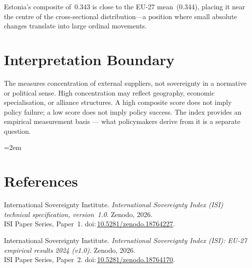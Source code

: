 \documentclass[12pt,a4paper]{article}
\begin{document}
Estonia's composite of~0.343 is close to the EU-27 mean~(0.344), placing it near the centre of the cross-sectional distribution---a position where small absolute changes translate into large ordinal movements.


\section{Interpretation Boundary}
\label{sec:interpretation}

The \ISI measures concentration of external suppliers, not sovereignty in a normative or political sense.  High concentration may reflect geography, economic specialisation, or alliance structures.  A high composite score does not imply policy failure; a low score does not imply policy success.  The index provides an empirical measurement basis --- what policymakers derive from it is a separate question.


\clearpage
\vspace*{1.5cm}

\begingroup\emergencystretch=2em
\section*{References}

\begin{enumerate}[label={[\arabic*]},leftmargin=2em,itemsep=6pt]
\item International Sovereignty Institute.
  \textit{International Sovereignty Index (ISI) technical specification, version~1.0}.
  Zenodo, 2026.\\ISI Paper Series, Paper~1.
  doi:\,\href{https://doi.org/10.5281/zenodo.18764227}{10.5281/zenodo.18764227}.

\item International Sovereignty Institute.
  \textit{International Sovereignty Index (ISI): EU-27 empirical results 2024 (v1.0)}.
  Zenodo, 2026.\\ISI Paper Series, Paper~2.
  doi:\,\href{https://doi.org/10.5281/zenodo.18764170}{10.5281/zenodo.18764170}.
\end{enumerate}
\endgroup
\end{document}

